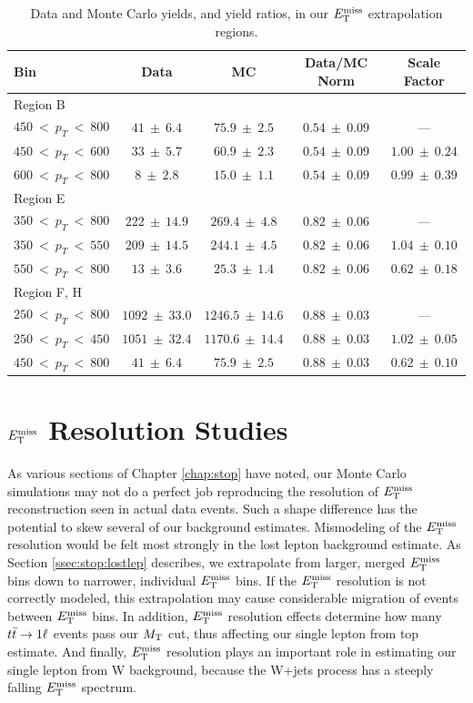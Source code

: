 \begin{table}[htb]
\centering
\caption{Data and Monte Carlo yields, and yield ratios, in our $E_\text{T}^\text{miss}$
  extrapolation regions.}
\label{tab:emu:sfmetextrap}
\begin{tabular}{|l|c|c|c|c|} \hline
Bin & Data & MC & Data/MC Norm & Scale Factor \\ \hline \hline
 \multicolumn{5}{|l|}{Region B} \\ \hline
 $450~<~p_{T}~<~800$ & $41~\pm~6.4$ & $75.9~\pm~2.5$ & $0.54~\pm~0.09$ & ---\\ \hline \hline
 $450~<~p_{T}~<~600$ & $33~\pm~5.7$ & $60.9~\pm~2.3$ & $0.54~\pm~0.09$ & $1.00~\pm~0.24$ \\ \hline
 $600~<~p_{T}~<~800$ & $8~\pm~2.8$ & $15.0~\pm~1.1$ & $0.54~\pm~0.09$ & $0.99~\pm~0.39$ \\ \hline
\hline
\multicolumn{5}{|l|}{Region E} \\ \hline
 $350~<~p_{T}~<~800$ & $222~\pm~14.9$ & $269.4~\pm~4.8$ & $0.82~\pm~0.06$ & ---\\ \hline \hline
 $350~<~p_{T}~<~550$ & $209~\pm~14.5$ & $244.1~\pm~4.5$ & $0.82~\pm~0.06$ & $1.04~\pm~0.10$ \\ \hline
 $550~<~p_{T}~<~800$ & $13~\pm~3.6$ & $25.3~\pm~1.4$ & $0.82~\pm~0.06$ & $0.62~\pm~0.18$ \\ \hline
\hline
\multicolumn{5}{|l|}{Region F, H} \\ \hline
 $250~<~p_{T}~<~800$ & $1092~\pm~33.0$ & $1246.5~\pm~14.6$ & $0.88~\pm~0.03$ & ---\\ \hline \hline
 $250~<~p_{T}~<~450$ & $1051~\pm~32.4$ & $1170.6~\pm~14.4$ & $0.88~\pm~0.03$ & $1.02~\pm~0.05$ \\ \hline
 $450~<~p_{T}~<~800$ & $41~\pm~6.4$ & $75.9~\pm~2.5$ & $0.88~\pm~0.03$ & $0.62~\pm~0.10$ \\ \hline
\end{tabular}
\end{table}

\chapter{\texorpdfstring{$E_\text{T}^\text{miss}$}{MET} Resolution Studies}
\label{apx:stop:metres}

As various sections of Chapter \ref{chap:stop} have noted, our Monte
Carlo simulations may not do a perfect job reproducing the resolution
of $E_\text{T}^\text{miss}$ reconstruction seen in actual data events. Such a shape difference has
the potential to skew several of our background estimates.
Mismodeling of the $E_\text{T}^\text{miss}$ resolution would be felt most strongly in
the lost lepton background estimate. As Section
\ref{ssec:stop:lostlep} describes, we
extrapolate from larger, merged $E_\text{T}^\text{miss}$ bins down to narrower,
individual $E_\text{T}^\text{miss}$ bins. If the $E_\text{T}^\text{miss}$ resolution is not correctly modeled,
this extrapolation may cause considerable migration of events between
$E_\text{T}^\text{miss}$ bins. In addition, $E_\text{T}^\text{miss}$ resolution effects determine how many
$t\bar{t} \rightarrow 1\ell$ events pass our $M_\text{T}$ cut, thus affecting our single
lepton from top estimate. And finally, $E_\text{T}^\text{miss}$ resolution plays an
important role in estimating our single lepton from W background,
because the W+jets process has a steeply falling $E_\text{T}^\text{miss}$ spectrum.

